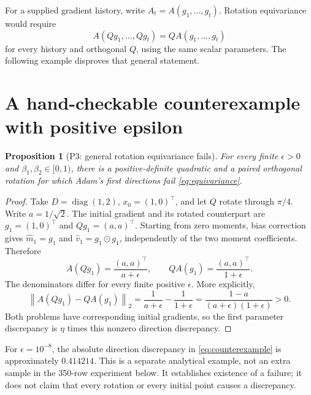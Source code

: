 \documentclass[11pt,a4paper]{article}
\newtheorem{proposition}{Proposition}
\newcommand{\norm}[1]{\left\lVert#1\right\rVert}
\begin{document}
For a supplied gradient history, write $A_t=A(g_1,\ldots,g_t)$.
Rotation equivariance would require
\begin{equation}
 A(Qg_1,\ldots,Qg_t)=QA(g_1,\ldots,g_t)
 \label{eq:equivariance}
\end{equation}
for every history and orthogonal $Q$, using the same scalar parameters.
The following example disproves that general statement.

\section{A hand-checkable counterexample with positive epsilon}
\begin{proposition}[P3: general rotation equivariance fails]
For every finite $\epsilon>0$ and $\beta_1,\beta_2\in[0,1)$, there is a
positive-definite quadratic and a paired orthogonal rotation for which
Adam's first directions fail \eqref{eq:equivariance}.
\end{proposition}
\begin{proof}
Take $D=\operatorname{diag}(1,2)$, $x_0=(1,0)^\top$, and let $Q$ rotate
through $\pi/4$. Write $a=1/\sqrt2$. The initial gradient and its rotated
counterpart are $g_1=(1,0)^\top$ and $Qg_1=(a,a)^\top$.
Starting from zero moments, bias correction gives
$\widehat m_1=g_1$ and $\widehat v_1=g_1\odot g_1$, independently of the
two moment coefficients. Therefore
\[
 A(Qg_1)=\frac{(a,a)^\top}{a+\epsilon},\qquad
 QA(g_1)=\frac{(a,a)^\top}{1+\epsilon}.
\]
The denominators differ for every finite positive $\epsilon$. More explicitly,
\begin{equation}
 \norm{A(Qg_1)-QA(g_1)}_2
 =\frac1{a+\epsilon}-\frac1{1+\epsilon}
 =\frac{1-a}{(a+\epsilon)(1+\epsilon)}>0.
 \label{eq:counterexample}
\end{equation}
Both problems have corresponding initial gradients, so the first parameter
discrepancy is $\eta$ times this nonzero direction discrepancy.
\end{proof}

For $\epsilon=10^{-8}$, the absolute direction discrepancy in
\eqref{eq:counterexample} is approximately $0.414214$.
This is a separate analytical example, not an extra sample in the
350-row experiment below. It establishes existence of a failure; it does
not claim that every rotation or every initial point causes a discrepancy.
\end{document}
